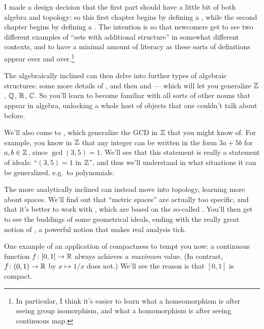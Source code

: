 \begin{itemize}
I made a design decision that the first part
should have a little bit of both algebra and topology:
so this first chapter begins by defining a ,
while the second chapter begins by defining a .
The intention is so that newcomers get to see two different
examples of ``sets with additional structure''
in somewhat different contexts,
and to have a minimal amount of literacy as these sorts
of definitions appear over and over.\footnote{In particular,
	I think it's easier to learn
	what a homeomorphism is after seeing group isomorphism,
	and what a homomorphism is after seeing continuous map.}

The algebraically inclined can then delve into
further types of algebraic structures:
some more details of ,
and then  and  ---
which will let you generalize $\mathbb Z$, $\mathbb Q$, $\mathbb R$, $\mathbb C$.
So you'll learn to become familiar with all sorts of other nouns
that appear in algebra, unlocking a whole host of objects
that one couldn't talk about before.

We'll also come to ,
which generalize the GCD in $\mathbb Z$ that you might know of.
For example, you know in $\mathbb Z$ that any integer
can be written in the form $3a+5b$ for $a,b \in \mathbb Z$,
since $\gcd(3,5)=1$.
We'll see that this statement is really
a statement of ideals: ``$(3,5)=1$ in $\mathbb Z$'',
and thus we'll understand in what situations
it can be generalized, e.g.\ to polynomials.

The more analytically inclined can instead move into topology,
learning more about spaces.
We'll find out that ``metric spaces'' are actually too specific,
and that it's better to work with ,
which are based on the so-called .
You'll then get to see the buddings of some geometrical ideals,
ending with the really great notion of ,
a powerful notion that makes real analysis tick.

One example of an application of compactness to tempt you now:
a continuous function $f \colon [0,1] \to \mathbb R$
always achieves a \emph{maximum} value.
(In contrast, $f \colon (0,1) \to \mathbb R$ by $x \mapsto 1/x$ does not.)
We'll see the reason is that $[0,1]$ is compact.
\end{itemize}

